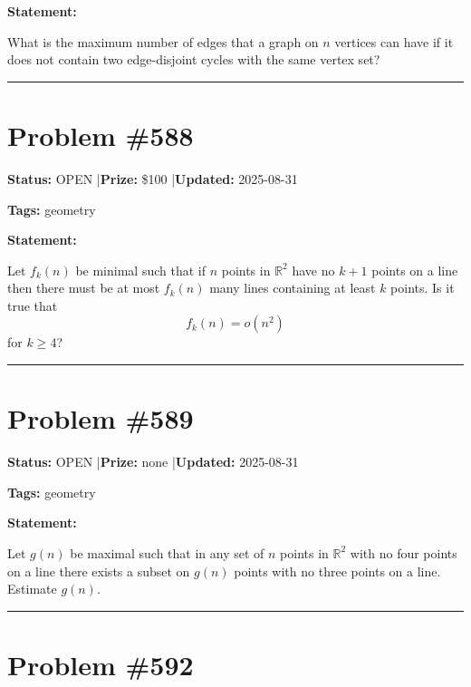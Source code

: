 \documentclass{article}
\begin{document}
\medskip

\noindent\textbf{Statement:}

What is the maximum number of edges that a graph on $n$ vertices can have if it does not contain two edge-disjoint cycles with the same vertex set?

\noindent\rule{\linewidth}{0.4pt}


\section{Problem \#588}
\label{prob:588}

\noindent\textbf{Status:} OPEN \quad|\quad \textbf{Prize:} \$100 \quad|\quad \textbf{Updated:} 2025-08-31

\noindent\textbf{Tags:} geometry

\medskip

\noindent\textbf{Statement:}

Let $f_k(n)$ be minimal such that if $n$ points in $\mathbb{R}^2$ have no $k+1$ points on a line then there must be at most $f_k(n)$ many lines containing at least $k$ points. Is it true that\[f_k(n)=o(n^2)\]for $k\geq 4$?

\noindent\rule{\linewidth}{0.4pt}


\section{Problem \#589}
\label{prob:589}

\noindent\textbf{Status:} OPEN \quad|\quad \textbf{Prize:} none \quad|\quad \textbf{Updated:} 2025-08-31

\noindent\textbf{Tags:} geometry

\medskip

\noindent\textbf{Statement:}

Let $g(n)$ be maximal such that in any set of $n$ points in $\mathbb{R}^2$ with no four points on a line there exists a subset on $g(n)$ points with no three points on a line. Estimate $g(n)$.

\noindent\rule{\linewidth}{0.4pt}


\section{Problem \#592}
\label{prob:592}
\end{document}

